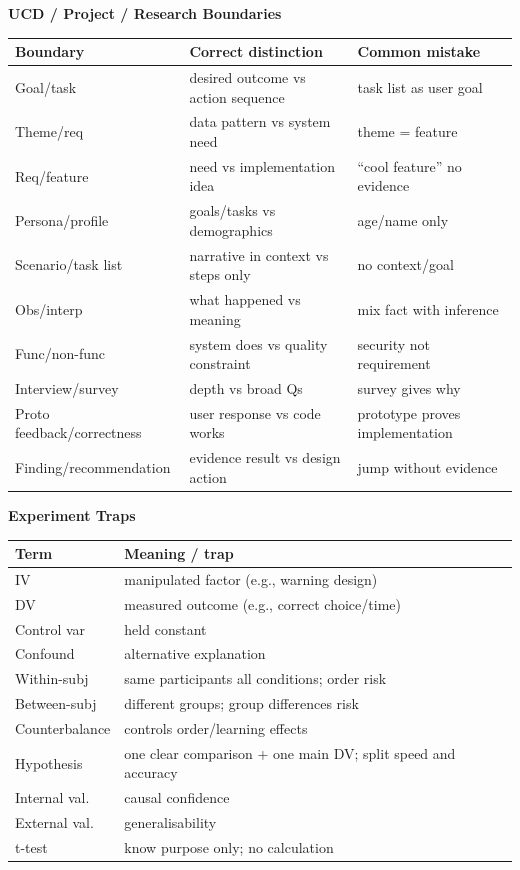 \documentclass[8pt]{extarticle}
\newcommand{\h}[1]{\vspace{1pt}\textbf{#1}\par}
\begin{document}
\begin{multicols*}{5}
\h{UCD / Project / Research Boundaries}
\begin{tabularx}{\linewidth}{@{}lYY@{}}
\toprule
Boundary & Correct distinction & Common mistake\\ \midrule
Goal/task & desired outcome vs action sequence & task list as user goal\\
Theme/req & data pattern vs system need & theme = feature\\
Req/feature & need vs implementation idea & ``cool feature'' no evidence\\
Persona/profile & goals/tasks vs demographics & age/name only\\
Scenario/task list & narrative in context vs steps only & no context/goal\\
Obs/interp & what happened vs meaning & mix fact with inference\\
Func/non-func & system does vs quality constraint & security not requirement\\
Interview/survey & depth vs broad Qs & survey gives why\\
Proto feedback/correctness & user response vs code works & prototype proves implementation\\
Finding/recommendation & evidence result vs design action & jump without evidence\\
\bottomrule
\end{tabularx}

\h{Experiment Traps}
\begin{tabularx}{\linewidth}{@{}lY@{}}
\toprule
Term & Meaning / trap\\ \midrule
IV & manipulated factor (e.g., warning design)\\
DV & measured outcome (e.g., correct choice/time)\\
Control var & held constant\\
Confound & alternative explanation\\
Within-subj & same participants all conditions; order risk\\
Between-subj & different groups; group differences risk\\
Counterbalance & controls order/learning effects\\
Hypothesis & one clear comparison + one main DV; split speed and accuracy\\
Internal val. & causal confidence\\
External val. & generalisability\\
t-test & know purpose only; no calculation\\
\bottomrule
\end{tabularx}


\end{multicols*}
\end{document}
